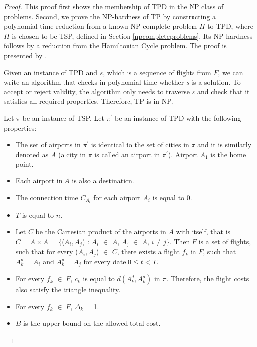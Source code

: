 \documentclass{mprop}
\theoremstyle{definition}
\begin{document}
\begin{proof}
\label{npcompleteproof}
This proof first shows the membership of TPD in the NP class of problems. Second, we prove the NP-hardness of TP by constructing a polynomial-time reduction from a known NP-complete problem $\Pi$ to TPD, where $\Pi$ is chosen to be TSP, defined in Section \ref{npcompleteproblems}. Its NP-hardness follows by a reduction from the Hamiltonian Cycle problem. The proof is presented by \citet{thebible}.

Given an instance of TPD and $s$, which is a sequence of flights from $F$, we can write an algorithm that checks in polynomial time whether $s$ is a solution. To accept or reject validity, the algorithm only needs to traverse $s$ and check that it satisfies all required properties. Therefore, TP is in NP.

Let $\pi$ be an instance of TSP. Let $\pi^{\prime}$ be an instance of TPD with the following properties:
\begin{itemize}
\item The set of airports in $\pi^{\prime}$ is identical to the set of cities in $\pi$ and it is similarly denoted as $A$ (a city in $\pi$ is called an airport in $\pi^{\prime}$). Airport $A_{1}$ is the home point.
\item Each airport in $A$ is also a destination.
\item The connection time $C_{A_{i}}$ for each airport $A_{i}$ is equal to 0.
\item $T$ is equal to $n$.
\item Let $C$ be the Cartesian product of the airports in $A$ with itself, that is $C = A \times A$ = \{($A_{i}, A_{j}$) : $A_{i}$ $\in$ $A$, $A_{j}$ $\in$ $A$, $i \neq j$\}. Then $F$ is a set of flights, such that for every ($A_{i}, A_{j}$) $\in$ $C$, there exists a flight $f_{k}$ in $F$, such that $A^{d}_{k} = A_{i}$ and $A^{a}_{k} = A_{j}$ for every date $0 \leq t < T$.
\item For every $f_{k}$ $\in$ $F$, $c_{k}$ is equal to $d(A^{d}_{k}, A^{a}_{k})$ in $\pi$. Therefore, the flight costs also satisfy the triangle inequality.
\item For every $f_{k}$ $\in$ $F$, $\Delta_{k}$ = 1.
\item $B$ is the upper bound on the allowed total cost.
\end{itemize}



\end{proof}
\end{document}
